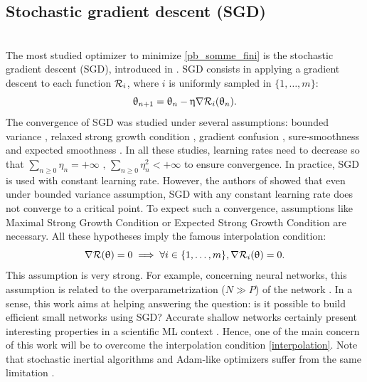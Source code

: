 \documentclass[article,authoryear,jmlmc]{beg_32}             %
\begin{document}
\subsection{Stochastic gradient descent (SGD)}
~~\\
The most studied optimizer to minimize \eqref{pb_somme_fini} is the stochastic gradient descent (SGD), introduced in \cite{SGD_Robins}. SGD consists in applying a gradient descent to each function $\mathcal{R}_i$, where $i$ is uniformly sampled in $\{1,\dots,m\}$:
\begin{equation}
	\uptheta_{n+1} = \uptheta_n-\upeta \nabla \mathcal{R}_i(\uptheta_n).
	\label{SGD}
\end{equation}
The convergence of SGD was studied under several assumptions:
bounded variance \cite{sgd_general_diminishing_lr,Bertsekas_basis,sgd_dynamical_basis,bertsekas_theorem,SGD_upper_bound}, relaxed strong growth condition \cite{RG_mean,RG_almost_sure}, gradient confusion \cite{gradient_confusion}, sure-smoothness \cite{sure_smoothness_sgd} and expected smoothness \cite{ES_sgd,sgd_descent_condition,ES_sgd,sgd_global_KL}. In all these studies, learning rates need to decrease so that
$
	\sum_{n\geq 0} \eta_n = +\infty \text{ , } \sum_{n\geq 0} \eta_n^{2}<+\infty
$
to ensure convergence. In practice, SGD is used with constant learning rate. However, the authors of \cite{sgd_prec} showed that even under bounded variance assumption, SGD with any constant learning rate does not converge to a critical point. To expect such a convergence, assumptions like Maximal Strong Growth Condition \cite{MSG_strong_convex,MSG_IG} or Expected Strong Growth Condition \cite{ESG_upper_bound} are necessary. All these hypotheses imply the famous interpolation condition:
\begin{equation}
  \nabla \mathcal{R}(\uptheta)=0 \implies \forall i\in\{1,\dots,m\}, \nabla \mathcal{R}_i(\uptheta)=0.
	\label{interpolation}
\end{equation}
This assumption is very strong. For example, concerning neural networks, this assumption is related to the overparametrization ($N\gg P$) of the network \cite{ESG_upper_bound,ESG_IG}. 
In a sense, this work aims at helping answering the question: is it possible to build efficient small networks using SGD?
Accurate shallow networks certainly present interesting properties in a {scientific ML context \cite{FV_scheme,reentry,acc_newt,FRANCK,plasma,KluthRipoll,DESPRES2020109275}}. 
Hence, one of the main concern of this work will be to overcome the interpolation condition \eqref{interpolation}. Note that stochastic inertial algorithms and Adam-like optimizers suffer from the same limitation \cite{sgd_prec,adam1,adam2,zou_rms,rms_not_bounded}.
\end{document}
